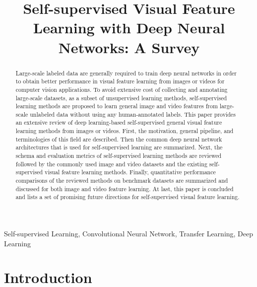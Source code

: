 \documentclass[conference]{IEEEtran}
\begin{document}
\title{Self-supervised Visual Feature Learning with Deep Neural Networks: A Survey
}

\author{
}

\maketitle

\begin{abstract}
Large-scale labeled data are generally required to train deep neural networks in order to obtain better performance in visual feature learning from images or videos for computer vision applications.
To avoid extensive cost of collecting and annotating large-scale datasets, as a subset of unsupervised learning methods, self-supervised learning methods are proposed to learn general image and video features from large-scale unlabeled data without using any human-annotated labels.
This paper provides an extensive review of deep learning-based self-supervised general visual feature learning methods from images or videos. First, the motivation, general pipeline, and terminologies of this field are described. Then the common deep neural network architectures that is used for self-supervised learning are summarized.
Next, the schema and evaluation metrics of self-supervised learning methods are reviewed followed by the commonly used image and video datasets and the existing self-supervised visual feature learning methods.
Finally, quantitative performance comparisons of the reviewed methods on benchmark datasets are summarized and discussed for both image and video feature learning.
At last, this paper is concluded and lists a set of promising future directions for self-supervised visual feature learning.
\end{abstract}

\begin{IEEEkeywords}
Self-supervised Learning, Convolutional Neural Network, Transfer Learning, Deep Learning
\end{IEEEkeywords}

\section{Introduction}
\end{document}
